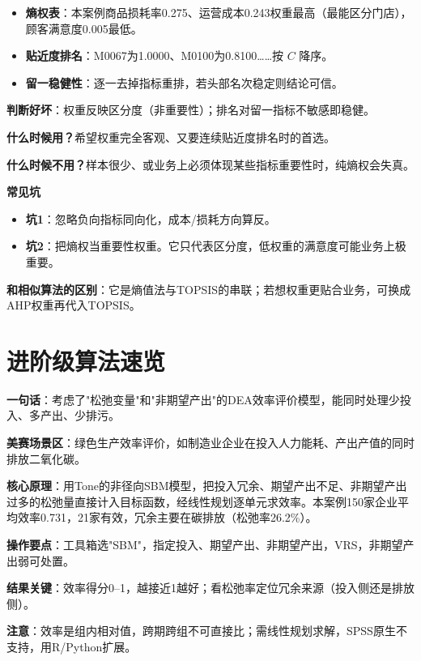 \begin{algoresult}
\begin{itemize}
    \item \textbf{熵权表}：本案例商品损耗率0.275、运营成本0.243权重最高（最能区分门店），顾客满意度0.005最低。
    \item \textbf{贴近度排名}：M0067为1.0000、M0100为0.8100……按 $C$ 降序。
    \item \textbf{留一稳健性}：逐一去掉指标重排，若头部名次稳定则结论可信。
\end{itemize}

\textbf{判断好坏}：权重反映区分度（非重要性）；排名对留一指标不敏感即稳健。
\end{algoresult}

\begin{algonotes}
\textbf{什么时候用？}希望权重完全客观、又要连续贴近度排名时的首选。

\textbf{什么时候不用？}样本很少、或业务上必须体现某些指标重要性时，纯熵权会失真。

\textbf{常见坑}
\begin{itemize}
    \item \textbf{坑1}：忽略负向指标同向化，成本/损耗方向算反。
    \item \textbf{坑2}：把熵权当重要性权重。它只代表区分度，低权重的满意度可能业务上极重要。
\end{itemize}

\textbf{和相似算法的区别}：它是熵值法与TOPSIS的串联；若想权重更贴合业务，可换成AHP权重再代入TOPSIS。
\end{algonotes}

\section{进阶级算法速览}


\begin{algobrief}
\textbf{一句话}：考虑了"松弛变量"和"非期望产出"的DEA效率评价模型，能同时处理少投入、多产出、少排污。

\textbf{美赛场景区}：绿色生产效率评价，如制造业企业在投入人力能耗、产出产值的同时排放二氧化碳。

\textbf{核心原理}：用Tone的非径向SBM模型，把投入冗余、期望产出不足、非期望产出过多的松弛量直接计入目标函数，经线性规划逐单元求效率。本案例150家企业平均效率0.731，21家有效，冗余主要在碳排放（松弛率26.2\%）。

\textbf{操作要点}：工具箱选"SBM"，指定投入、期望产出、非期望产出，VRS，非期望产出弱可处置。

\textbf{结果关键}：效率得分0--1，越接近1越好；看松弛率定位冗余来源（投入侧还是排放侧）。

\textbf{注意}：效率是组内相对值，跨期跨组不可直接比；需线性规划求解，SPSS原生不支持，用R/Python扩展。
\end{algobrief}

